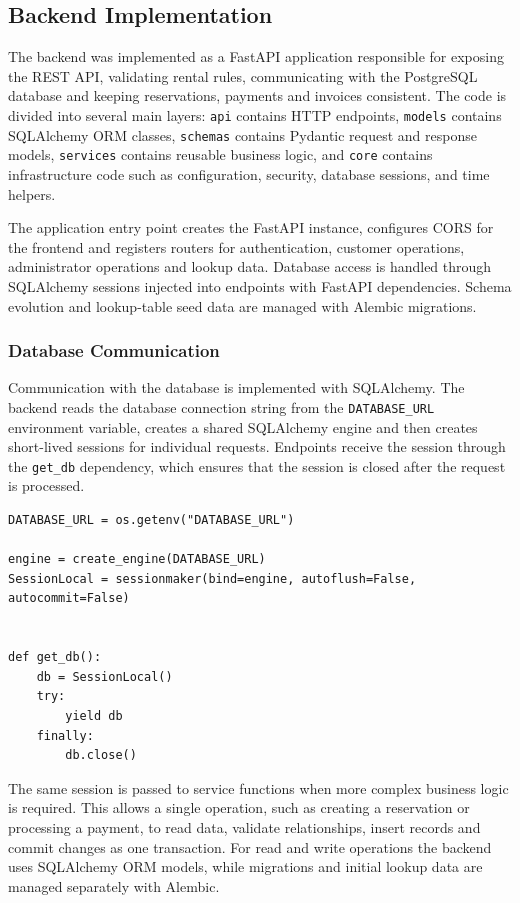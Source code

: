 \subsection{Backend Implementation}

The backend was implemented as a FastAPI application responsible for exposing the REST API, validating rental rules, communicating with the PostgreSQL database and keeping reservations, payments and invoices consistent. The code is divided into several main layers: \texttt{api} contains HTTP endpoints, \texttt{models} contains SQLAlchemy ORM classes, \texttt{schemas} contains Pydantic request and response models, \texttt{services} contains reusable business logic, and \texttt{core} contains infrastructure code such as configuration, security, database sessions, and time helpers.

The application entry point creates the FastAPI instance, configures CORS for the frontend and registers routers for authentication, customer operations, administrator operations and lookup data. Database access is handled through SQLAlchemy sessions injected into endpoints with FastAPI dependencies. Schema evolution and lookup-table seed data are managed with Alembic migrations.

\subsubsection{Database Communication}

Communication with the database is implemented with SQLAlchemy. The backend reads the database connection string from the \texttt{DATABASE\_URL} environment variable, creates a shared SQLAlchemy engine and then creates short-lived sessions for individual requests. Endpoints receive the session through the \texttt{get\_db} dependency, which ensures that the session is closed after the request is processed.

\begin{lstlisting}[style=pythonstyle,caption={Database engine and request-scoped session},label={lst:backend-db-short}]
DATABASE_URL = os.getenv("DATABASE_URL")

engine = create_engine(DATABASE_URL)
SessionLocal = sessionmaker(bind=engine, autoflush=False, autocommit=False)


def get_db():
    db = SessionLocal()
    try:
        yield db
    finally:
        db.close()
\end{lstlisting}

The same session is passed to service functions when more complex business logic is required. This allows a single operation, such as creating a reservation or processing a payment, to read data, validate relationships, insert records and commit changes as one transaction. For read and write operations the backend uses SQLAlchemy ORM models, while migrations and initial lookup data are managed separately with Alembic.

